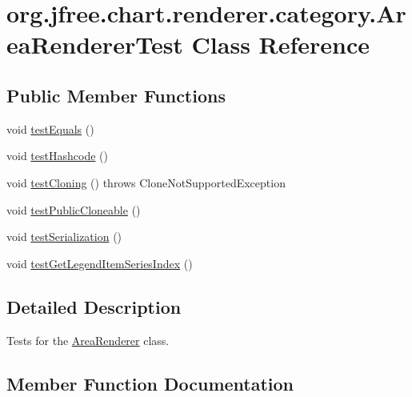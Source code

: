 \hypertarget{classorg_1_1jfree_1_1chart_1_1renderer_1_1category_1_1_area_renderer_test}{}\section{org.\+jfree.\+chart.\+renderer.\+category.\+Area\+Renderer\+Test Class Reference}
\label{classorg_1_1jfree_1_1chart_1_1renderer_1_1category_1_1_area_renderer_test}
\subsection*{Public Member Functions}
\begin{DoxyCompactItemize}
\item 
void \mbox{\hyperlink{classorg_1_1jfree_1_1chart_1_1renderer_1_1category_1_1_area_renderer_test_a8abcfb09b48da905efef91dcd683397d}{test\+Equals}} ()
\item 
void \mbox{\hyperlink{classorg_1_1jfree_1_1chart_1_1renderer_1_1category_1_1_area_renderer_test_a7c7761698aaf41d04de6a96b90c726a5}{test\+Hashcode}} ()
\item 
void \mbox{\hyperlink{classorg_1_1jfree_1_1chart_1_1renderer_1_1category_1_1_area_renderer_test_ab9726296ef6dd62c72863e9aa25a8010}{test\+Cloning}} ()  throws Clone\+Not\+Supported\+Exception 
\item 
void \mbox{\hyperlink{classorg_1_1jfree_1_1chart_1_1renderer_1_1category_1_1_area_renderer_test_aec71c835b4cb87ec0f4d5bab020f368e}{test\+Public\+Cloneable}} ()
\item 
void \mbox{\hyperlink{classorg_1_1jfree_1_1chart_1_1renderer_1_1category_1_1_area_renderer_test_ac506762187fbe38f201345d84a7efbc5}{test\+Serialization}} ()
\item 
void \mbox{\hyperlink{classorg_1_1jfree_1_1chart_1_1renderer_1_1category_1_1_area_renderer_test_aed034c5ea85945eb7dffe8e0a46477ca}{test\+Get\+Legend\+Item\+Series\+Index}} ()
\end{DoxyCompactItemize}


\subsection{Detailed Description}
Tests for the \mbox{\hyperlink{classorg_1_1jfree_1_1chart_1_1renderer_1_1category_1_1_area_renderer}{Area\+Renderer}} class. 

\subsection{Member Function Documentation}
\mbox{\label{classorg_1_1jfree_1_1chart_1_1renderer_1_1category_1_1_area_renderer_test_ab9726296ef6dd62c72863e9aa25a8010}} 
